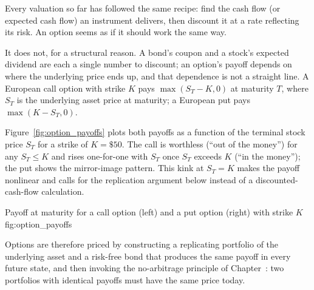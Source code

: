 \documentclass[../ai_in_finance]{subfiles}
\begin{document}
Every valuation so far has followed the same recipe: find the cash flow (or expected cash flow) an instrument delivers, then discount it at a rate reflecting its risk. An option seems as if it should work the same way.

It does not, for a structural reason. A bond's coupon and a stock's expected dividend are each a single number to discount; an option's payoff depends on where the underlying price ends up, and that dependence is not a straight line. A European call option with strike $K$ pays $\max(S_T - K, 0)$ at maturity $T$, where $S_T$ is the underlying asset price at maturity; a European put pays $\max(K - S_T, 0)$.

Figure~\ref{fig:option_payoffs} plots both payoffs as a function of the terminal stock price $S_T$ for a strike of $K=\$50$. The call is worthless (``out of the money'') for any $S_T \le K$ and rises one-for-one with $S_T$ once $S_T$ exceeds $K$ (``in the money''); the put shows the mirror-image pattern. This kink at $S_T=K$ makes the payoff nonlinear and calls for the replication argument below instead of a discounted-cash-flow calculation.

\begin{bookfigure}[htbp]{Payoff at maturity for a call option (left) and a put option (right) with strike $K$}{fig:option_payoffs}
\end{bookfigure}

Options are therefore priced by constructing a replicating portfolio of the underlying asset and a risk-free bond that produces the same payoff in every future state, and then invoking the no-arbitrage principle of Chapter~: two portfolios with identical payoffs must have the same price today.
\end{document}
